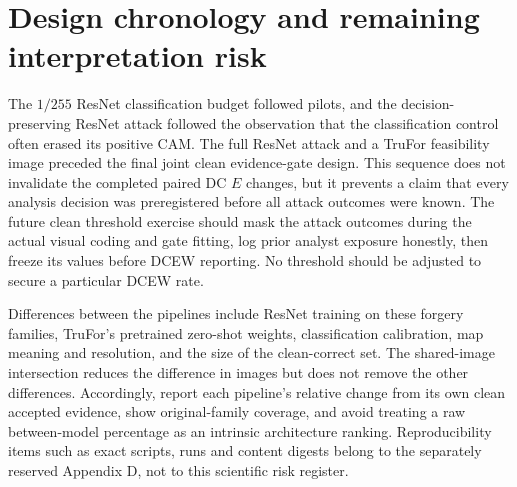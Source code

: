 \section{Design chronology and remaining interpretation risk}

The $1/255$ ResNet classification budget followed pilots, and the decision-preserving ResNet attack followed the observation that the classification control often erased its positive CAM. The full ResNet attack and a TruFor feasibility image preceded the final joint clean evidence-gate design. This sequence does not invalidate the completed paired DC $E$ changes, but it prevents a claim that every analysis decision was preregistered before all attack outcomes were known. The future clean threshold exercise should mask the attack outcomes during the actual visual coding and gate fitting, log prior analyst exposure honestly, then freeze its values before DCEW reporting. No threshold should be adjusted to secure a particular DCEW rate.

Differences between the pipelines include ResNet training on these forgery families, TruFor's pretrained zero-shot weights, classification calibration, map meaning and resolution, and the size of the clean-correct set. The shared-image intersection reduces the difference in images but does not remove the other differences. Accordingly, report each pipeline's relative change from its own clean accepted evidence, show original-family coverage, and avoid treating a raw between-model percentage as an intrinsic architecture ranking. Reproducibility items such as exact scripts, runs and content digests belong to the separately reserved Appendix D, not to this scientific risk register.
